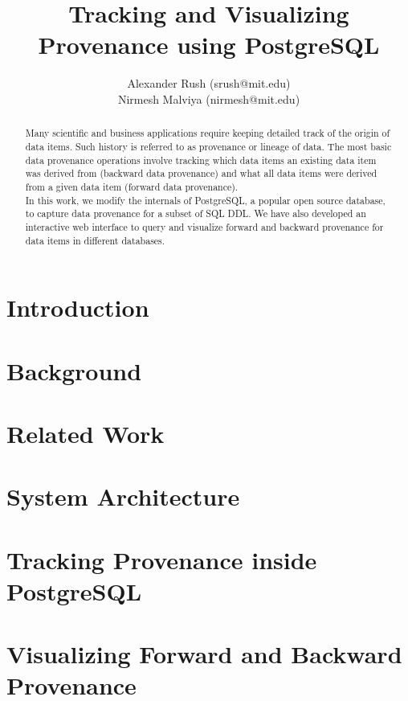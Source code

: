 \documentclass[11pt]{article}
\title{Tracking and Visualizing Provenance using PostgreSQL}
\author{Alexander Rush (srush@mit.edu)\\ Nirmesh Malviya (nirmesh@mit.edu)}
\begin{document}
\maketitle

\begin{abstract}
Many scientific and business applications require keeping detailed track of the origin of data items. Such history is referred to as provenance or lineage of data. The most basic data provenance operations involve tracking which data items an existing data item was derived from (backward data provenance) and what all data items were derived from a given data item (forward data provenance). \\

In this work, we modify the internals of PostgreSQL, a popular open source database, to capture data provenance for a subset of SQL DDL. We have also developed an interactive web interface to query and visualize forward and backward provenance for data items in different databases.
\end{abstract}

\section{Introduction}


\section{Background}


\section{Related Work}


\section{System Architecture}




\section{Tracking Provenance inside PostgreSQL}


\section{Visualizing Forward and Backward Provenance}
\end{document}
